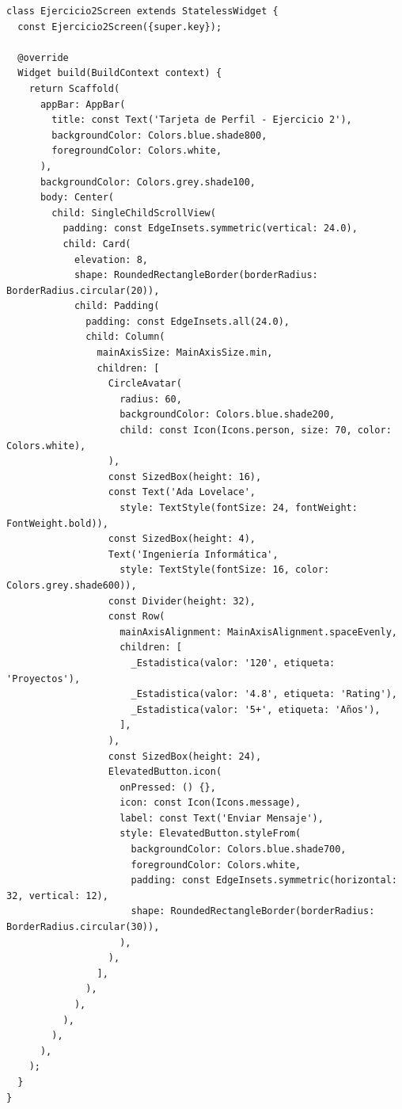 \documentclass[12pt,a4paper]{article}
\begin{document}
\begin{lstlisting}[caption={Estructura de la Tarjeta de Perfil (lib/screens/ejercicio2\_screen.dart)}]
class Ejercicio2Screen extends StatelessWidget {
  const Ejercicio2Screen({super.key});

  @override
  Widget build(BuildContext context) {
    return Scaffold(
      appBar: AppBar(
        title: const Text('Tarjeta de Perfil - Ejercicio 2'),
        backgroundColor: Colors.blue.shade800,
        foregroundColor: Colors.white,
      ),
      backgroundColor: Colors.grey.shade100,
      body: Center(
        child: SingleChildScrollView(
          padding: const EdgeInsets.symmetric(vertical: 24.0),
          child: Card(
            elevation: 8,
            shape: RoundedRectangleBorder(borderRadius: BorderRadius.circular(20)),
            child: Padding(
              padding: const EdgeInsets.all(24.0),
              child: Column(
                mainAxisSize: MainAxisSize.min,
                children: [
                  CircleAvatar(
                    radius: 60,
                    backgroundColor: Colors.blue.shade200,
                    child: const Icon(Icons.person, size: 70, color: Colors.white),
                  ),
                  const SizedBox(height: 16),
                  const Text('Ada Lovelace',
                    style: TextStyle(fontSize: 24, fontWeight: FontWeight.bold)),
                  const SizedBox(height: 4),
                  Text('Ingeniería Informática',
                    style: TextStyle(fontSize: 16, color: Colors.grey.shade600)),
                  const Divider(height: 32),
                  const Row(
                    mainAxisAlignment: MainAxisAlignment.spaceEvenly,
                    children: [
                      _Estadistica(valor: '120', etiqueta: 'Proyectos'),
                      _Estadistica(valor: '4.8', etiqueta: 'Rating'),
                      _Estadistica(valor: '5+', etiqueta: 'Años'),
                    ],
                  ),
                  const SizedBox(height: 24),
                  ElevatedButton.icon(
                    onPressed: () {},
                    icon: const Icon(Icons.message),
                    label: const Text('Enviar Mensaje'),
                    style: ElevatedButton.styleFrom(
                      backgroundColor: Colors.blue.shade700,
                      foregroundColor: Colors.white,
                      padding: const EdgeInsets.symmetric(horizontal: 32, vertical: 12),
                      shape: RoundedRectangleBorder(borderRadius: BorderRadius.circular(30)),
                    ),
                  ),
                ],
              ),
            ),
          ),
        ),
      ),
    );
  }
}
\end{lstlisting}
\end{document}

